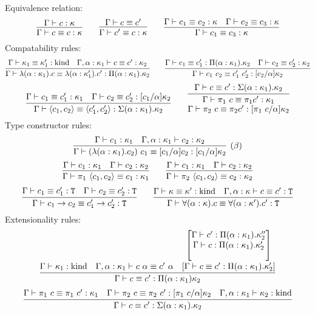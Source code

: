 \begin{judgment}\mbox{}\\
Equivalence relation:
  \[
    \infer{\Gamma \vdash c \equiv c : \kappa}{\Gamma \vdash c : \kappa}
    \qquad
    \infer{\Gamma \vdash c' \equiv c : \kappa}{\Gamma \vdash c \equiv c'}
    \qquad
    \infer{\Gamma \vdash c_1 \equiv c_3 : \kappa}
      {\Gamma \vdash c_1 \equiv c_2 : \kappa
      &\Gamma \vdash c_2 \equiv c_3 : \kappa
      }
  \]
Compatability rules:
  \[
    \infer{\Gamma \vdash \lambda(\alpha : \kappa_1).c \equiv \lambda(\alpha : \kappa_1').c'
      : \Pi(\alpha : \kappa_1).\kappa_2}
      {\Gamma \vdash \kappa_1 \equiv \kappa_1' : \kind
      &\Gamma, \alpha : \kappa_1 \vdash c \equiv c' : \kappa_2
      }
    \qquad
    \infer{\Gamma \vdash c_1~c_2 \equiv c_1'~c_2' : [c_2/\alpha]\kappa_2}
      {\Gamma \vdash c_1 \equiv c_1' : \Pi(\alpha : \kappa_1).\kappa_2
      &\Gamma \vdash c_2 \equiv c_2' : \kappa_2
      }
  \]
  \[
    \infer{\Gamma \vdash \langle c_1, c_2 \rangle \equiv \langle c_1', c_2' \rangle
      : \Sigma(\alpha : \kappa_1).\kappa_2}
      {\Gamma \vdash c_1 \equiv c_1' : \kappa_1
      &\Gamma \vdash c_2 \equiv c_2' : [c_1 / \alpha]\kappa_2
      }
    \qquad
    \infer{
      \deduce
         {\Gamma \vdash \pi_2~c \equiv \pi_2 c' : [\pi_1~c/\alpha]\kappa_2}
         {\Gamma \vdash \pi_1~c \equiv \pi_1 c' : \kappa_1}
      }
      {\Gamma \vdash c \equiv c' : \Sigma(\alpha : \kappa_1).\kappa_2}
  \]
  Type constructor rules:
  \[
    \infer[(\beta)]
      {\Gamma \vdash (\lambda (\alpha : \kappa_1). c_2)~c_1 \equiv
        [c_1/\alpha]c_2 : [c_1/\alpha]\kappa_2}
      {\Gamma \vdash c_1 : \kappa_1
      &\Gamma, \alpha : \kappa_1 \vdash c_2 : \kappa_2
      }
  \]
  \[
    \infer{\Gamma \vdash \pi_1~\langle c_1, c_2 \rangle \equiv c_1 : \kappa_1}
      {\Gamma \vdash c_1 : \kappa_1
      &\Gamma \vdash c_2 : \kappa_2
      }
    \qquad
    \infer{\Gamma \vdash \pi_2~\langle c_1, c_2 \rangle \equiv c_2 : \kappa_2}
      {\Gamma \vdash c_1 : \kappa_1
      &\Gamma \vdash c_2 : \kappa_2
      }
  \]
  \[
    \infer{\Gamma \vdash c_1 \to c_2 \equiv c_1' \to c_2' : \T}
      {\Gamma \vdash c_1 \equiv c_1' : \T
      &\Gamma \vdash c_2 \equiv c_2' : \T
      }
    \qquad
    \infer{\Gamma \vdash \forall (\alpha : \kappa).c \equiv \forall(\alpha : \kappa').c' : \T}
      {\Gamma \vdash \kappa \equiv \kappa' : \kind
      &\Gamma, \alpha : \kappa \vdash c \equiv c' : \T
      }
  \]
Extensionality rules:
\[
  \infer{\Gamma \vdash c \equiv c' : \Pi(\alpha : \kappa_1) \kappa_2}
    {\Gamma \vdash \kappa_1 : \kind
    &\Gamma, \alpha : \kappa_1 \vdash c~\alpha \equiv c'~\alpha
    &\deduce{\left[ \Gamma \vdash c \equiv c' : \Pi(\alpha : \kappa_1).\kappa_2' \right]}
      {
        \left[\deduce{\Gamma \vdash c : \Pi(\alpha : \kappa_1).\kappa_2'}
              {\Gamma \vdash c' : \Pi(\alpha : \kappa_1).\kappa_2''}\right]
      }
    }
\]
\[
  \infer{\Gamma \vdash c \equiv c' : \Sigma(\alpha : \kappa_1).\kappa_2}
    {\Gamma \vdash \pi_1~c \equiv \pi_1~c' : \kappa_1
    &\Gamma \vdash \pi_2~c \equiv \pi_2~c' : [\pi_1~c/\alpha]\kappa_2
    &\Gamma, \alpha : \kappa_1 \vdash \kappa_2 : \kind
    }
\]
\end{judgment}
